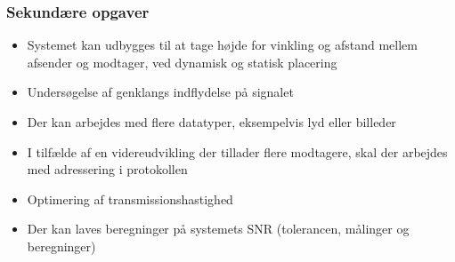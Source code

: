 \subsubsection{Sekundære opgaver}

\begin{itemize}
\item Systemet kan udbygges til at tage højde for vinkling og afstand mellem afsender og modtager, ved dynamisk og statisk placering
\item Undersøgelse af genklangs indflydelse på signalet
\item Der kan arbejdes med flere datatyper, eksempelvis lyd eller billeder
\item I tilfælde af en videreudvikling der tillader flere modtagere, skal der arbejdes med adressering i protokollen
\item Optimering af transmissionshastighed
\item Der kan laves beregninger på systemets SNR (tolerancen, målinger og beregninger)
\end{itemize}